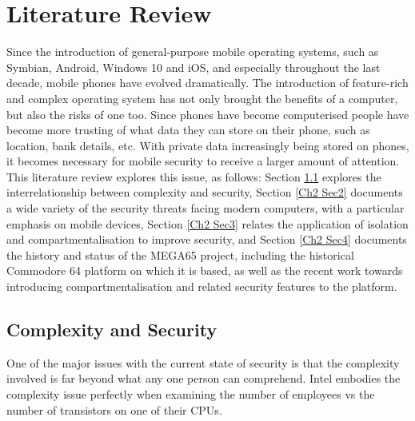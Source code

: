 
\chapter{Literature Review} %

\label{Chapter 2} %

Since the introduction of general-purpose mobile operating systems, such as Symbian, Android, Windows 10 and iOS, and especially throughout the last decade, mobile phones have evolved dramatically.\cite{Reference1}
The introduction of feature-rich and complex operating system has not only brought the benefits of a computer, but also the risks of one too.\cite{Reference2}
Since phones have become computerised people have become more trusting of what data they can store on their phone, such as location, bank details, etc.\cite{Reference3}
With private data increasingly being stored on phones, it becomes necessary for mobile security to receive a larger amount of attention.
This literature review explores this issue, as follows: Section \ref{Ch2 Sec1} explores the interrelationship between complexity and security, Section \ref{Ch2 Sec2} documents a wide variety of the security threats facing modern computers, with a particular emphasis on mobile devices, Section \ref{Ch2 Sec3} relates the application of isolation and compartmentalisation to improve security, and Section \ref{Ch2 Sec4} documents the history and status of the MEGA65 project, including the historical Commodore 64 platform on which it is based, as well as the recent work towards introducing compartmentalisation and related 
security features to the platform.


\section{Complexity and Security}

\label{Ch2 Sec1}

One of the major issues with the current state of security is that the complexity involved is far beyond what any one person can comprehend.
Intel embodies the complexity issue perfectly when examining the number of employees vs the number of transistors on one of their CPUs.\\

